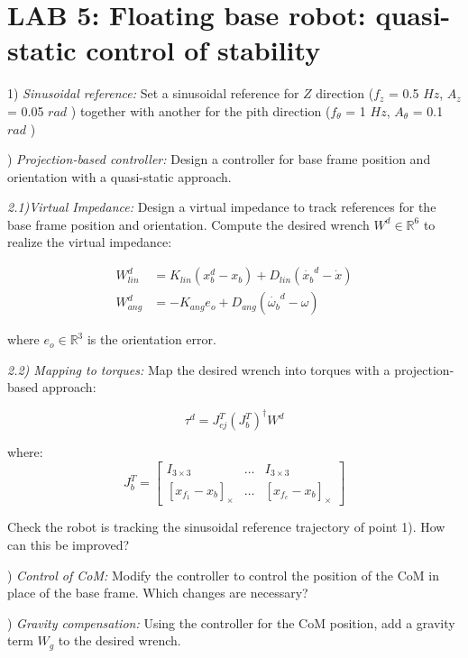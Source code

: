 \documentclass{report}
\newcommand{\Rnum}{\mathbb{R}} %
\newcommand{\mat}[1]{\ensuremath{\begin{bmatrix}#1\end{bmatrix}}}	%
\begin{document}
\section*{LAB 5: Floating base robot: quasi-static control of stability}


1) \textit{Sinusoidal reference:} 
Set a sinusoidal reference for $Z$ direction ($f_z$ = 0.5 $Hz$, $A_z$ = 0.05 $rad$ )
together with another for the pith direction ($f_{\theta}$ = 1 $Hz$, $A_{\theta}$ = 0.1 $rad$ )

\quad

) \textit{Projection-based controller:} 
Design a controller for base frame position and orientation with a quasi-static approach.

 \textit{2.1)Virtual Impedance:}
Design a virtual impedance to track  references for the base frame position and orientation. Compute the desired wrench $W^d \in\Rnum^6$ to realize the virtual impedance:

\begin{align}
W^d_{lin} &= K_{lin} (x^d_b - x_b ) + D_{lin} (\dot{x_b}^d - \dot{x})   \\
W^d_{ang} &=  - K_{ang} e_o + D_{ang} (\dot{\omega_b}^d - \omega)
\end{align}

where $e_o \in \Rnum^3$ is the orientation error. 

\textit{2.2) Mapping to torques:}
Map the desired wrench into torques  with a projection-based approach:

\begin{equation}
\tau^d = J_{cj}^T(J_b^T)^{\dagger} W^d
\end{equation}

where:
\begin{equation}
J_b^T = \mat{I_{3\times3} & \dots & I_{3\times3} \\
			[x_{f_1} - x_b]_{\times} & \dots & [x_{f_c} - x_b]_{\times}}
\end{equation}

Check the robot is tracking the sinusoidal reference trajectory of point 1). How can this be improved? 

\quad

) \textit{Control of CoM:}
Modify the controller to control the position of the CoM in place of the base frame.
Which changes are necessary?

) \textit{Gravity compensation:}
Using the controller for the CoM position, add a gravity term $W_g$ to the desired wrench.
\end{document}
